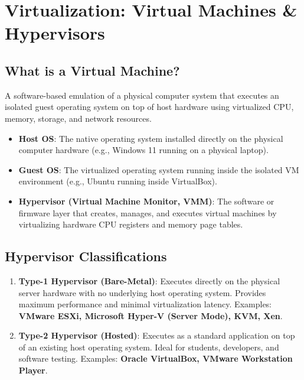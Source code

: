 \section{Virtualization: Virtual Machines \& Hypervisors}

\subsection{What is a Virtual Machine?}

\begin{definition}
A software-based emulation of a physical computer system that executes an isolated guest operating system on top of host hardware using virtualized CPU, memory, storage, and network resources.
\end{definition}

\begin{itemize}[leftmargin=1.5em]
    \item \textbf{Host OS}: The native operating system installed directly on the physical computer hardware (e.g., Windows 11 running on a physical laptop).
    \item \textbf{Guest OS}: The virtualized operating system running inside the isolated VM environment (e.g., Ubuntu running inside VirtualBox).
    \item \textbf{Hypervisor (Virtual Machine Monitor, VMM)}: The software or firmware layer that creates, manages, and executes virtual machines by virtualizing hardware CPU registers and memory page tables.
\end{itemize}

\subsection{Hypervisor Classifications}
\begin{enumerate}[leftmargin=1.5em]
    \item \textbf{Type-1 Hypervisor (Bare-Metal)}:
    Executes directly on the physical server hardware with no underlying host operating system. Provides maximum performance and minimal virtualization latency. Examples: \textbf{VMware ESXi, Microsoft Hyper-V (Server Mode), KVM, Xen}.
    \item \textbf{Type-2 Hypervisor (Hosted)}:
    Executes as a standard application on top of an existing host operating system. Ideal for students, developers, and software testing. Examples: \textbf{Oracle VirtualBox, VMware Workstation Player}.
\end{enumerate}

